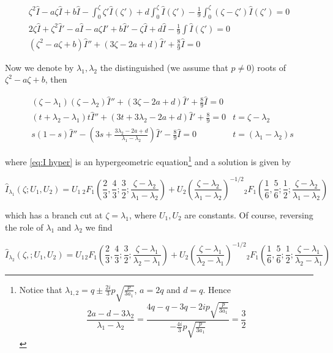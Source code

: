 \documentclass[11pt,a4paper,twoside,leqno,noamsfonts]{amsart}
\numberwithin{equation}{section}
\begin{document}
\begin{align*}
\zeta^2\hat{I}-a\zeta\hat{I}+b\hat{I}-\int_0^{\zeta}\zeta'\hat{I}(\zeta')+d\int_0^{\zeta}\hat{I}(\zeta')-\frac{1}{9}\int_0^{\zeta}(\zeta-\zeta')\hat{I}(\zeta')=0\\
2\zeta\hat{I}+\zeta^2\hat{I}'-a\hat{I}-a\zeta\hat{I}'+b\hat{I}'-\zeta\hat{I}+d\hat{I}-\frac{1}{9}\int\hat{I}(\zeta')=0\\
(\zeta^2-a\zeta+b)\hat{I}''+(3\zeta-2a+d)\hat{I}'+\frac{8}{9}\hat{I}=0
\end{align*}

Now we denote by $\lambda_1,\lambda_2$ the distinguished (we assume that $p\neq 0$) roots of $\zeta^2-a\zeta+b$, then 

\begin{align}
& (\zeta-\lambda_1)(\zeta-\lambda_2)\hat{I}''+(3\zeta-2a+d)\hat{I}'+\frac{8}{9}\hat{I}=0 & \\
&(t+\lambda_2-\lambda_1)t\hat{I}''+(3t+3\lambda_2-2a+d)\hat{I}'+\frac{8}{9}=0 & t=\zeta-\lambda_2 \\
& \label{eq:I hyper} s(1-s)\hat{I}''-\left(3s+\frac{3\lambda_2-2a+d}{\lambda_1-\lambda_2}\right)\hat{I}'-\frac{8}{9}\hat{I}=0 & t=(\lambda_1-\lambda_2)s
\end{align}

where \eqref{eq:I hyper} is an hypergeometric equation\footnote{Notice that $\lambda_{1,2}=q\pm \frac{2i}{3}p\sqrt{\frac{p}{3a_1}}$, $a=2q$ and $d=q$. Hence \[\frac{2a-d-3\lambda_2}{\lambda_1-\lambda_2}=\frac{4q-q-3q-2ip\sqrt{\frac{p}{3a_1}}}{-\frac{4i}{3}p\sqrt{\frac{p}{3a_1}}}=\frac{3}{2}\]} and a solution is given by

\begin{equation}
\hat{I}_{\lambda_1}(\zeta;U_1,U_2)=U_1\,{}_2F_1\left(\frac{2}{3},\frac{4}{3};\frac{3}{2};\frac{\zeta-\lambda_2}{\lambda_1-\lambda_2}\right)+U_2\left(\frac{\zeta-\lambda_2}{\lambda_1-\lambda_2}\right)^{-1/2}{}_2F_1\left(\frac{1}{6},\frac{5}{6};\frac{1}{2};\frac{\zeta-\lambda_2}{\lambda_1-\lambda_2}\right)
\end{equation}  

which has a branch cut at $\zeta=\lambda_1$, where $U_1,U_2$ are constants. Of course, reversing the role of $\lambda_1$ and $\lambda_2$ we find  

\begin{equation}
\hat{I}_{\lambda_2}(\zeta,;U_1,U_2)=U_1{}_2F_1\left(\frac{2}{3},\frac{4}{3};\frac{3}{2};\frac{\zeta-\lambda_1}{\lambda_2-\lambda_1}\right)+U_2\left(\frac{\zeta-\lambda_1}{\lambda_2-\lambda_1}\right)^{-1/2}{}_2F_1\left(\frac{1}{6},\frac{5}{6};\frac{1}{2};\frac{\zeta-\lambda_1}{\lambda_2-\lambda_1}\right)
\end{equation} 
\end{document}
